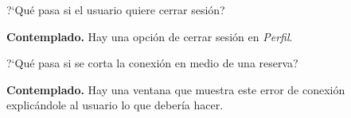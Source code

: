 \begin{escenario} %
    \centering
    ?`Qué pasa si el usuario quiere cerrar sesión?

    \begin{solucion}
        \centering
        \textbf{Contemplado.} Hay una opción de cerrar sesión en \textit{Perfil}.
    \end{solucion}
\end{escenario}

\begin{escenario} %
    \centering
    ?`Qué pasa si se corta la conexión en medio de una reserva?

    \begin{solucion}
        \centering
        \textbf{Contemplado.} Hay una ventana que muestra este error de conexión explicándole al usuario lo que debería hacer.
    \end{solucion}
\end{escenario}
